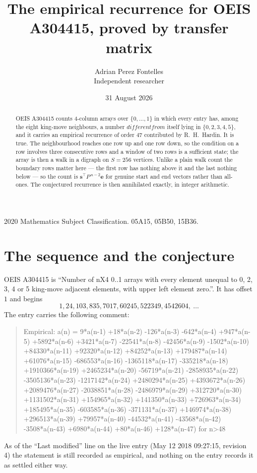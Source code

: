 \documentclass[11pt,a4paper]{article}
\title{The empirical recurrence for OEIS A304415, proved by transfer matrix}
\author{Adrian Perez Fontelles\\ \small Independent researcher}
\date{31 August 2026}
\theoremstyle{plain}
\theoremstyle{definition}
\begin{document}
\maketitle

\begin{abstract}
OEIS A304415 counts $4$-column arrays over $\{0,\dots,1\}$ in which every entry has,
among the eight king-move neighbours, a number $different from$ itself lying in $\{0,2,3,4,5\}$, and it carries an empirical
recurrence of order $47$ contributed by R.~H.~Hardin. It is true. The neighbourhood
reaches one row up and one row down, so the condition on a row involves three consecutive
rows and a window of two rows is a sufficient state; the array is then a walk in a digraph
on $S=256$ vertices. Unlike a plain walk count the boundary rows matter here --- the first
row has nothing above it and the last nothing below --- so the count is
$\mathbf{s}^{\!\top}P^{\,n-2}\mathbf{e}$ for genuine start and end vectors rather than
all-ones. The conjectured recurrence is then annihilated exactly, in integer arithmetic.
\end{abstract}

\noindent\small 2020 Mathematics Subject Classification. 05A15, 05B50, 15B36.\normalsize

\section{The sequence and the conjecture}

OEIS A304415 is ``Number of nX4 0..1 arrays with every element unequal to 0, 2, 3, 4 or 5 king-move adjacent elements, with upper left element zero.''. It has offset
$1$ and begins
\[
1, 24, 103, 835, 7017, 60245, 522349, 4542604,\ \dots
\]
The entry carries the following comment:
\begin{quote}\small
Empirical: a(n) = 9*a(n-1) +18*a(n-2) -126*a(n-3) -642*a(n-4) +947*a(n-5) +5892*a(n-6) +3421*a(n-7) -22541*a(n-8) -42456*a(n-9) -1502*a(n-10) +84330*a(n-11) +92320*a(n-12) +84252*a(n-13) +179487*a(n-14) +61076*a(n-15) -686553*a(n-16) -1365118*a(n-17) -335218*a(n-18) +1910366*a(n-19) +2465234*a(n-20) -56719*a(n-21) -2858935*a(n-22) -3505136*a(n-23) -1217142*a(n-24) +2480294*a(n-25) +4393672*a(n-26) +2089476*a(n-27) -2038851*a(n-28) -2486979*a(n-29) +312720*a(n-30) +1131502*a(n-31) +154965*a(n-32) +141350*a(n-33) +726963*a(n-34) +185495*a(n-35) -603585*a(n-36) -371131*a(n-37) +146974*a(n-38) +296513*a(n-39) +79957*a(n-40) -44532*a(n-41) -43568*a(n-42) -3508*a(n-43) +6980*a(n-44) +80*a(n-46) +128*a(n-47) for n>48
\end{quote}
As of the ``Last modified'' line on the live entry (May 12 2018 09:27:15, revision
4) the statement is still recorded as empirical, and nothing on the entry
records it as settled either way.
\end{document}
